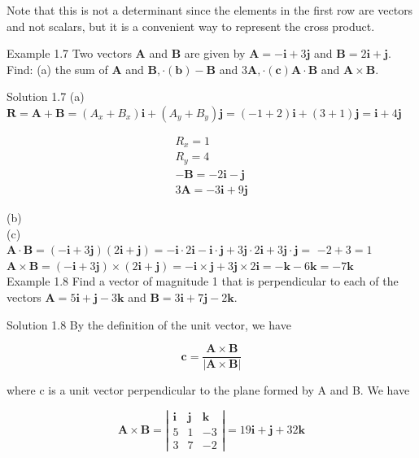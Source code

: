 \documentclass[10pt]{article}
\numberwithin{equation}{section}
\begin{document}
Note that this is not a determinant since the elements in the first row are vectors and not scalars, but it is a convenient way to represent the cross product.

Example 1.7 Two vectors $\mathbf{A}$ and $\mathbf{B}$ are given by $\mathbf{A}=-\mathbf{i}+3 \mathbf{j}$ and $\mathbf{B}=2 \mathbf{i}+\mathbf{j}$. Find: (a) the sum of $\mathbf{A}$ and $\mathbf{B}, \cdot(\mathbf{b})-\mathbf{B}$ and $3 \mathbf{A}, \cdot(\mathbf{c}) \mathbf{A} \cdot \mathbf{B}$ and $\mathbf{A} \times \mathbf{B}$.

Solution 1.7 (a)\\
$\mathbf{R}=\mathbf{A}+\mathbf{B}=\left(A_{x}+B_{x}\right) \mathbf{i}+\left(A_{y}+B_{y}\right) \mathbf{j}=(-1+2) \mathbf{i}+(3+1) \mathbf{j}=\mathbf{i}+4 \mathbf{j}$

$$
\begin{gathered}
R_{x}=1 \\
R_{y}=4 \\
-\mathbf{B}=-2 \mathbf{i}-\mathbf{j} \\
3 \mathbf{A}=-3 \mathbf{i}+9 \mathbf{j}
\end{gathered}
$$

(b)\\
(c)\\
$\mathbf{A} \cdot \mathbf{B}=(-\mathbf{i}+3 \mathbf{j})(2 \mathbf{i}+\mathbf{j})=-\mathbf{i} \cdot 2 \mathbf{i}-\mathbf{i} \cdot \mathbf{j}+3 \mathbf{j} \cdot 2 \mathbf{i}+3 \mathbf{j} \cdot \mathbf{j}=$ $-2+3=1$\\
$\mathbf{A} \times \mathbf{B}=(-\mathbf{i}+3 \mathbf{j}) \times(2 \mathbf{i}+\mathbf{j})=-\mathbf{i} \times \mathbf{j}+3 \mathbf{j} \times 2 \mathbf{i}=-\mathbf{k}-6 \mathbf{k}=-7 \mathbf{k}$\\
Example 1.8 Find a vector of magnitude 1 that is perpendicular to each of the vectors $\mathbf{A}=5 \mathbf{i}+\mathbf{j}-3 \mathbf{k}$ and $\mathbf{B}=3 \mathbf{i}+7 \mathbf{j}-2 \mathbf{k}$.

Solution 1.8 By the definition of the unit vector, we have

$$
\mathbf{c}=\frac{\mathbf{A} \times \mathbf{B}}{|\mathbf{A} \times \mathbf{B}|}
$$

where c is a unit vector perpendicular to the plane formed by A and B. We have

$$
\mathbf{A} \times \mathbf{B}=\left|\begin{array}{lll}
\mathbf{i} & \mathbf{j} & \mathbf{k} \\
5 & 1 & -3 \\
3 & 7 & -2
\end{array}\right|=19 \mathbf{i}+\mathbf{j}+32 \mathbf{k}
$$
\end{document}
